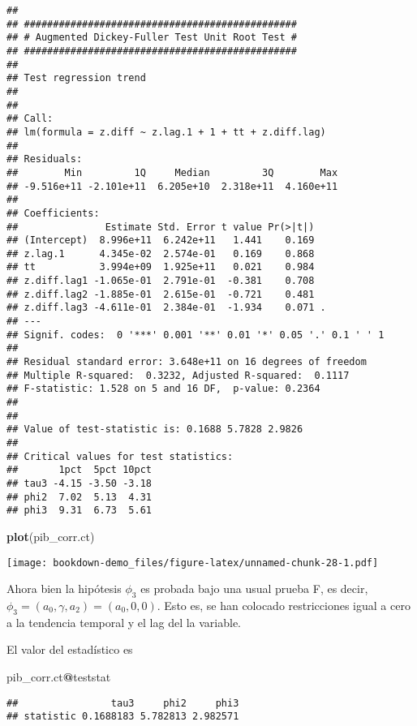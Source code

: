 \documentclass[]{book}
\newenvironment{Shaded}{\begin{snugshade}}{\end{snugshade}}
\newcommand{\KeywordTok}[1]{\textcolor[rgb]{0.13,0.29,0.53}{\textbf{#1}}}
\newcommand{\OperatorTok}[1]{\textcolor[rgb]{0.81,0.36,0.00}{\textbf{#1}}}
\newcommand{\NormalTok}[1]{#1}
\theoremstyle{definition}
\theoremstyle{definition}
\theoremstyle{definition}
\theoremstyle{remark}
\begin{document}
\begin{verbatim}
## 
## ############################################### 
## # Augmented Dickey-Fuller Test Unit Root Test # 
## ############################################### 
## 
## Test regression trend 
## 
## 
## Call:
## lm(formula = z.diff ~ z.lag.1 + 1 + tt + z.diff.lag)
## 
## Residuals:
##        Min         1Q     Median         3Q        Max 
## -9.516e+11 -2.101e+11  6.205e+10  2.318e+11  4.160e+11 
## 
## Coefficients:
##               Estimate Std. Error t value Pr(>|t|)  
## (Intercept)  8.996e+11  6.242e+11   1.441    0.169  
## z.lag.1      4.345e-02  2.574e-01   0.169    0.868  
## tt           3.994e+09  1.925e+11   0.021    0.984  
## z.diff.lag1 -1.065e-01  2.791e-01  -0.381    0.708  
## z.diff.lag2 -1.885e-01  2.615e-01  -0.721    0.481  
## z.diff.lag3 -4.611e-01  2.384e-01  -1.934    0.071 .
## ---
## Signif. codes:  0 '***' 0.001 '**' 0.01 '*' 0.05 '.' 0.1 ' ' 1
## 
## Residual standard error: 3.648e+11 on 16 degrees of freedom
## Multiple R-squared:  0.3232, Adjusted R-squared:  0.1117 
## F-statistic: 1.528 on 5 and 16 DF,  p-value: 0.2364
## 
## 
## Value of test-statistic is: 0.1688 5.7828 2.9826 
## 
## Critical values for test statistics: 
##       1pct  5pct 10pct
## tau3 -4.15 -3.50 -3.18
## phi2  7.02  5.13  4.31
## phi3  9.31  6.73  5.61
\end{verbatim}

\begin{Shaded}
\begin{Highlighting}[]
\KeywordTok{plot}\NormalTok{(pib_corr.ct)}
\end{Highlighting}
\end{Shaded}

\texttt{[image: bookdown-demo\_files/figure-latex/unnamed-chunk-28-1.pdf]}

Ahora bien la hipótesis \(\phi_3\) es probada bajo una usual prueba F,
es decir, \(\phi_3=(a_0,\gamma,a_2) = (a_0,0,0)\). Esto es, se han
colocado restricciones igual a cero a la tendencia temporal y el lag del
la variable.

El valor del estadístico es

\begin{Shaded}
\begin{Highlighting}[]
\NormalTok{pib_corr.ct}\OperatorTok{@}\NormalTok{teststat}
\end{Highlighting}
\end{Shaded}

\begin{verbatim}
##                tau3     phi2     phi3
## statistic 0.1688183 5.782813 2.982571
\end{verbatim}
\end{document}
